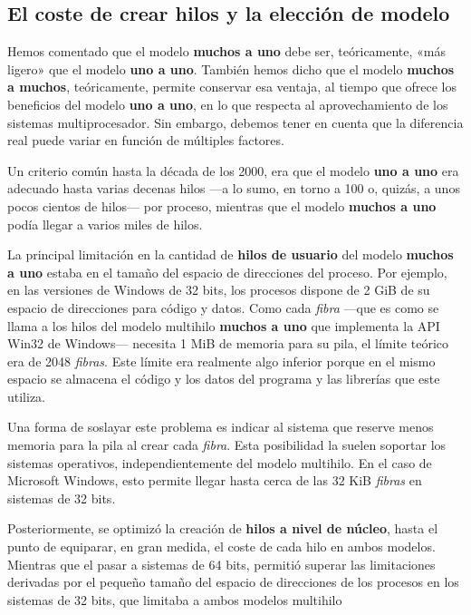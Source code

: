 \subsection{El coste de crear hilos y la elección de
modelo}\label{_el_coste_de_crear_hilos_y_la_elecciuxf3n_de_modelo}

Hemos comentado que el modelo \textbf{muchos a uno} debe ser,
teóricamente, «más ligero» que el modelo \textbf{uno a uno}. También
hemos dicho que el modelo \textbf{muchos a muchos}, teóricamente,
permite conservar esa ventaja, al tiempo que ofrece los beneficios del
modelo \textbf{uno a uno}, en lo que respecta al aprovechamiento de los
sistemas multiprocesador. Sin embargo, debemos tener en cuenta que la
diferencia real puede variar en función de múltiples factores.

Un criterio común hasta la década de los 2000, era que el modelo
\textbf{uno a uno} era adecuado hasta varias decenas hilos ---a lo sumo,
en torno a 100 o, quizás, a unos pocos cientos de hilos--- por proceso,
mientras que el modelo \textbf{muchos a uno} podía llegar a varios miles
de hilos.

La principal limitación en la cantidad de \textbf{hilos de usuario} del
modelo \textbf{muchos a uno} estaba en el tamaño del espacio de
direcciones del proceso. Por ejemplo, en las versiones de Windows de 32
bits, los procesos dispone de 2 GiB de su espacio de direcciones para
código y datos. Como cada \emph{fibra} ---que es como se llama a los
hilos del modelo multihilo \textbf{muchos a uno} que implementa la API
Win32 de Windows--- necesita 1 MiB de memoria para su pila, el límite
teórico era de 2048 \emph{fibras}. Este límite era realmente algo
inferior porque en el mismo espacio se almacena el código y los datos
del programa y las librerías que este utiliza.

Una forma de soslayar este problema es indicar al sistema que reserve
menos memoria para la pila al crear cada \emph{fibra}. Esta posibilidad
la suelen soportar los sistemas operativos, independientemente del
modelo multihilo. En el caso de Microsoft Windows, esto permite llegar
hasta cerca de las 32 KiB \emph{fibras} en sistemas de 32 bits.

Posteriormente, se optimizó la creación de \textbf{hilos a nivel de
núcleo}, hasta el punto de equiparar, en gran medida, el coste de cada
hilo en ambos modelos. Mientras que el pasar a sistemas de 64 bits,
permitió superar las limitaciones derivadas por el pequeño tamaño del
espacio de direcciones de los procesos en los sistemas de 32 bits, que
limitaba a ambos modelos multihilo

